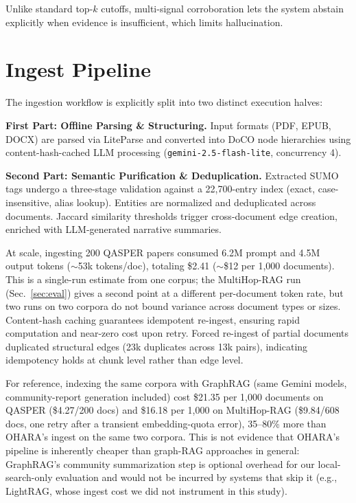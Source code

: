 \documentclass[conference,a4paper]{IEEEtran}
\begin{document}
Unlike standard top-$k$ cutoffs, multi-signal corroboration lets the system abstain explicitly when evidence is insufficient, which limits hallucination.

\section{Ingest Pipeline}

The ingestion workflow is explicitly split into two distinct execution halves:

\textbf{First Part: Offline Parsing \& Structuring.} Input formats (PDF, EPUB, DOCX) are parsed via LiteParse and converted into DoCO node hierarchies using content-hash-cached LLM processing (\texttt{gemini-2.5-flash-lite}, concurrency 4).

\textbf{Second Part: Semantic Purification \& Deduplication.} Extracted SUMO tags undergo a three-stage validation against a 22{,}700-entry index (exact, case-insensitive, alias lookup). Entities are normalized and deduplicated across documents. Jaccard similarity thresholds trigger cross-document edge creation, enriched with LLM-generated narrative summaries.

At scale, ingesting 200 QASPER papers consumed 6.2M prompt and 4.5M output tokens ($\sim$53k tokens/doc), totaling \$2.41 ($\sim$\$12 per 1{,}000 documents). This is a single-run estimate from one corpus; the MultiHop-RAG run (Sec.~\ref{sec:eval}) gives a second point at a different per-document token rate, but two runs on two corpora do not bound variance across document types or sizes. Content-hash caching guarantees idempotent re-ingest, ensuring rapid computation and near-zero cost upon retry. Forced re-ingest of partial documents duplicated structural edges (23k duplicates across 13k pairs), indicating idempotency holds at chunk level rather than edge level.

For reference, indexing the same corpora with GraphRAG \cite{edge2024graphrag} (same Gemini models, community-report generation included) cost \$21.35 per 1{,}000 documents on QASPER (\$4.27/200 docs) and \$16.18 per 1{,}000 on MultiHop-RAG (\$9.84/608 docs, one retry after a transient embedding-quota error), 35--80\% more than OHARA's ingest on the same two corpora. This is not evidence that OHARA's pipeline is inherently cheaper than graph-RAG approaches in general: GraphRAG's community summarization step is optional overhead for our local-search-only evaluation and would not be incurred by systems that skip it (e.g., LightRAG, whose ingest cost we did not instrument in this study).
\end{document}
